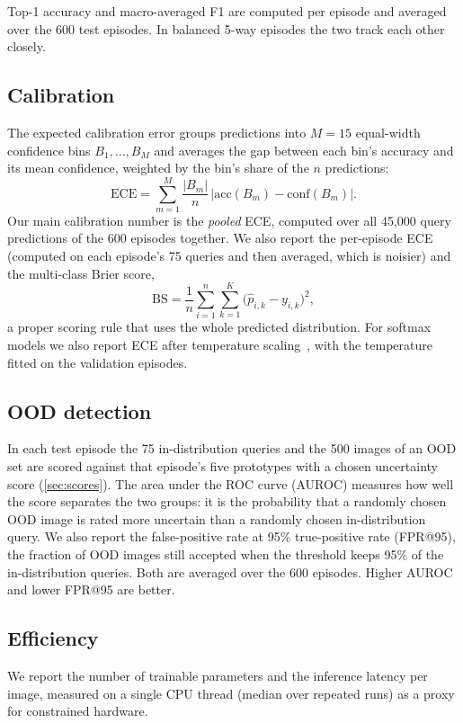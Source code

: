Top-1 accuracy and macro-averaged F1 are computed per episode and averaged over the 600 test episodes.
In balanced 5-way episodes the two track each other closely.

\subsection{Calibration}

The expected calibration error groups predictions into $M = 15$ equal-width confidence bins
$B_1, \dots, B_M$ and averages the gap between each bin's accuracy and its mean confidence, weighted by
the bin's share of the $n$ predictions:
\begin{equation}
\mathrm{ECE} = \sum_{m=1}^{M} \frac{|B_m|}{n} \,\bigl|\mathrm{acc}(B_m) - \mathrm{conf}(B_m)\bigr| .
\label{eq:ece}
\end{equation}
Our main calibration number is the \emph{pooled} ECE, computed over all 45{,}000 query predictions of
the 600 episodes together. We also report the per-episode ECE (computed on each episode's 75 queries and
then averaged, which is noisier) and the multi-class Brier score,
\begin{equation}
\mathrm{BS} = \frac{1}{n}\sum_{i=1}^{n}\sum_{k=1}^{K}\bigl(\hat p_{i,k} - y_{i,k}\bigr)^2 ,
\end{equation}
a proper scoring rule that uses the whole predicted distribution. For softmax models we also report ECE
after temperature scaling~\cite{guo2017calibration}, with the temperature fitted on the validation
episodes.

\subsection{OOD detection}

In each test episode the 75 in-distribution queries and the 500 images of an OOD set are scored against
that episode's five prototypes with a chosen uncertainty score (\cref{sec:scores}). The area under the
ROC curve (AUROC) measures how well the score separates the two groups: it is the probability that a
randomly chosen OOD image is rated more uncertain than a randomly chosen in-distribution query. We also
report the false-positive rate at 95\% true-positive rate (FPR@95), the fraction of OOD images still
accepted when the threshold keeps 95\% of the in-distribution queries. Both are averaged over the 600
episodes. Higher AUROC and lower FPR@95 are better.

\subsection{Efficiency}

We report the number of trainable parameters and the inference latency per image, measured on a single
CPU thread (median over repeated runs) as a proxy for constrained hardware.
